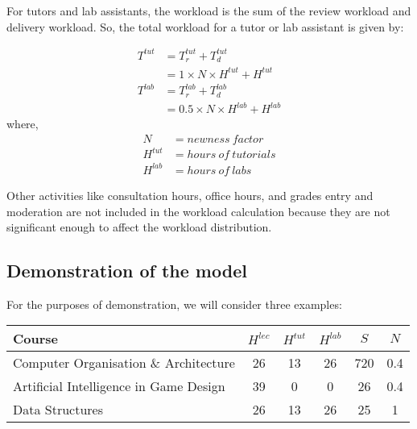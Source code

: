 For tutors and lab assistants, the workload is the sum of the review workload and delivery workload. So, the total workload for a tutor or lab assistant is given by:

\begin{equation}
  \label{eqn:total-workload-tut-lab}
  \begin{aligned}
    T^{tut} & = T_r^{tut} + T_d^{tut}                 \\
            & = 1 \times N \times H^{tut} + H^{tut}   \\
    T^{lab} & = T_r^{lab} + T_d^{lab}                 \\
            & = 0.5 \times N \times H^{lab} + H^{lab}
  \end{aligned}
\end{equation}
where,
\begin{equation}
  \nonumber
  \begin{aligned}
    N       & = newness\ factor      \\
    H^{tut} & = hours\ of\ tutorials \\
    H^{lab} & = hours\ of\ labs
  \end{aligned}
\end{equation}

Other activities like consultation hours, office hours, and grades entry and moderation are not included in the workload calculation because they are not significant enough to affect the workload distribution.

\subsection{Demonstration of the model}
\label{sec:workload_demo}

For the purposes of demonstration, we will consider three examples:

\begin{table}[ht]
  \centering
  \begin{tabular}{|l|c|c|c|c|c|}
    \hline
    \textbf{Course}                        & \(H^{lec}\) & \(H^{tut}\) & \(H^{lab}\) & \(S\) & \(N\) \\\hline
    Computer Organisation \& Architecture  & 26          & 13          & 26          & 720   & 0.4   \\\hline
    Artificial Intelligence in Game Design & 39          & 0           & 0           & 26    & 0.4   \\\hline
    Data Structures                        & 26          & 13          & 26          & 25    & 1     \\\hline
  \end{tabular}
\end{table}

